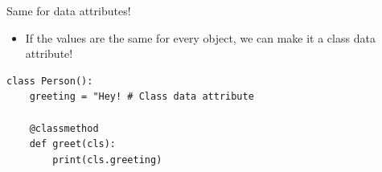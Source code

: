 \begin{frame}[fragile]{Same for data attributes!}
\pause
\begin{itemize}
    \item If the values are the same for every object, we can make it a class data attribute!
\end{itemize}
\begin{verbatim}
class Person():
    greeting = "Hey! # Class data attribute

    @classmethod
    def greet(cls):
        print(cls.greeting)
\end{verbatim}
\end{frame}